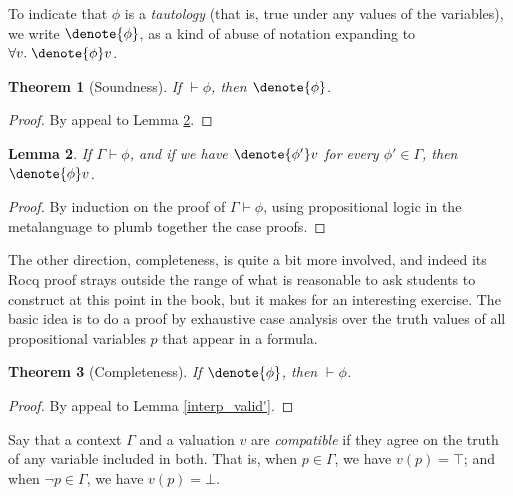 \documentclass{amsbook}
\newtheorem{theorem}{Theorem}[chapter]
\newtheorem{lemma}[theorem]{Lemma}
\theoremstyle{definition}
\theoremstyle{remark}
\numberwithin{section}{chapter}
\numberwithin{equation}{chapter}
\begin{document}
To indicate that $\phi$ is a \emph{tautology} (that is, true under any values of the variables), we write $\denote{\phi}$, as a kind of abuse of notation expanding to $\forall v. \; \denote{\phi}v$.

\begin{theorem}[Soundness]
  If $\vdash \phi$, then $\denote{\phi}$.
\end{theorem}
\begin{proof}
  By appeal to Lemma \ref{valid_interp'}.
\end{proof}

\begin{lemma}\label{valid_interp'}
  If $\Gamma \vdash \phi$, and if we have $\denote{\phi'}v$ for every $\phi' \in \Gamma$, then $\denote{\phi}v$.
\end{lemma}
\begin{proof}
  By induction on the proof of $\Gamma \vdash \phi$, using propositional logic in the metalanguage to plumb together the case proofs.
\end{proof}

The other direction, completeness, is quite a bit more involved, and indeed its Rocq proof strays outside the range of what is reasonable to ask students to construct at this point in the book, but it makes for an interesting exercise.
The basic idea is to do a proof by exhaustive case analysis over the truth values of all propositional variables $p$ that appear in a formula.

\begin{theorem}[Completeness]
  If $\denote{\phi}$, then $\vdash \phi$.
\end{theorem}
\begin{proof}
  By appeal to Lemma \ref{interp_valid'}.
\end{proof}

Say that a context $\Gamma$ and a valuation $v$ are \emph{compatible} if they agree on the truth of any variable included in both.
That is, when $p \in \Gamma$, we have $v(p) = \top$; and when $\neg p \in \Gamma$, we have $v(p) = \bot$.
\end{document}
